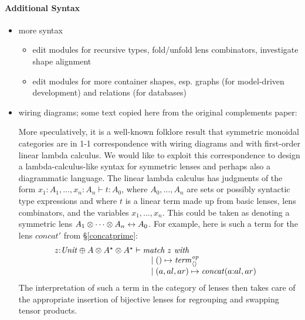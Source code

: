 \paragraph*{Additional Syntax}
\begin{itemize}
    \item more syntax
        \begin{itemize}
            \item edit modules for recursive types, fold/unfold lens combinators,
                investigate shape alignment
            \item edit modules for more container shapes, esp. graphs (for
                model-driven development) and relations (for databases)
        \end{itemize}
    \item wiring diagrams; some text copied here from the original
        complements paper:

        More speculatively, it is a well-known folklore result that
        symmetric monoidal categories are in 1-1 correspondence with wiring
        diagrams and with first-order linear lambda calculus. We would like
        to exploit this correspondence to design a lambda-calculus-like
        syntax for symmetric lenses and perhaps also a diagrammatic
        language. The linear lambda calculus has judgments of the form
        $x_1{:}A_1,\dots,x_n{:}A_n\vdash t:A_0$, where $A_0,\dots,A_n$ are
        sets or possibly syntactic type expressions and where $t$ is a
        linear term made up from basic lenses, lens combinators, and the
        variables $x_1,\dots,x_n$. This could be taken as denoting a
        symmetric lens $A_1\otimes\dots\otimes A_n\leftrightarrow A_0$. For example,
        here is such a term for the lens $\mathit{concat}'$ from
        \S\ref{concatprime}:
        \[\begin{array}{@{}l}
        z{:}\Unit \oplus A \otimes A\LIST\otimes A\LIST\vdash
            \begin{array}[t]{@{}l}
            \textit{match}\ z\ \textit{with} \\
            \quad \mid\mlinl\unit \mapsto \const_{\NIL}\op\\
            \quad\mid\mlinr(a,al,ar)\mapsto \mathit{concat}(a\CONS al,ar)
            \end{array}
        \end{array}
        \]
        The interpretation of such a term in the category of lenses then
        takes care of the appropriate insertion of bijective lenses for
        regrouping and swapping tensor products.

\end{itemize}

